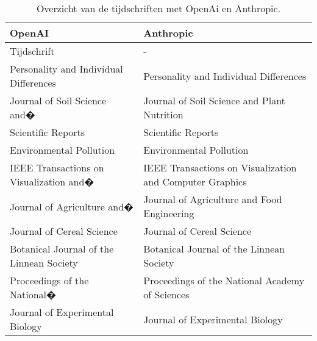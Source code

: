 \begin{table}[h!]
    \caption{Overzicht van de tijdschriften met OpenAi en Anthropic.}
    \centering
    \begin{tabularx}{\textwidth}{|X|X|} 
        \hline
        \rowcolor{lightgray}
        OpenAI & Anthropic \\ 
        \hline
        \rowcolor{lightgray}
        Tijdschrift & - \\ 
        \hline
        Personality and Individual Differences & Personality and Individual Differences \\ 
        Journal of Soil Science and� & Journal of Soil Science and Plant Nutrition \\
        Scientific Reports & Scientific Reports \\
        Environmental Pollution & Environmental Pollution \\
        IEEE Transactions on Visualization and� & IEEE Transactions on Visualization and Computer Graphics \\
        Journal of Agriculture and� & Journal of Agriculture and Food Engineering \\
        Journal of Cereal Science & Journal of Cereal Science \\
        Botanical Journal of the Linnean Society & Botanical Journal of the Linnean Society \\
        Proceedings of the National� & Proceedings of the National Academy of Sciences \\
        Journal of Experimental Biology & Journal of Experimental Biology \\
        \hline
    \end{tabularx}
    \label{table:llmTijdschrift}
\end{table}
